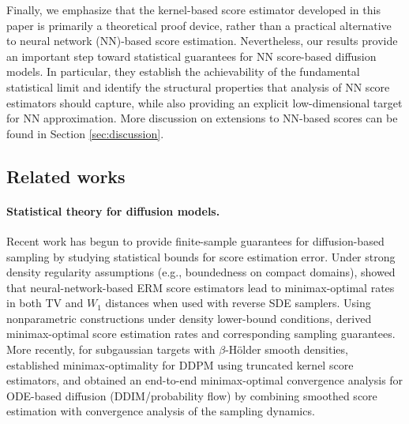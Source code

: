 \documentclass{article}
\theoremstyle{plain}
\theoremstyle{remark}
\begin{document}
Finally, we emphasize that the kernel-based score estimator developed in this paper is primarily a theoretical proof device, rather than a practical alternative to neural network (NN)-based score estimation. Nevertheless, our results provide an important step toward statistical guarantees for NN score-based diffusion models. 
In particular, they establish the achievability of the fundamental statistical limit and identify the structural properties that analysis of NN score estimators should capture, while also providing an explicit low-dimensional target for NN approximation. More discussion on extensions to NN-based scores can be found in Section \ref{sec:discussion}.





\subsection{Related works}
\label{sec:related works}

\paragraph*{Statistical theory for diffusion models.}
Recent work has begun to provide finite-sample guarantees for diffusion-based sampling by studying statistical bounds for score estimation error.
Under strong density regularity assumptions (e.g., boundedness on compact domains), \citet{oko2023diffusionmodelsminimaxoptimal} showed that neural-network-based ERM score estimators lead to minimax-optimal rates in both TV and $W_1$ distances when used with reverse SDE samplers.
Using nonparametric constructions under density lower-bound conditions, \citet{dou2024optimalscorematchingoptimal} derived minimax-optimal score estimation rates and corresponding sampling guarantees.
More recently, for subgaussian targets with $\beta$-H\"older smooth densities, \citet{zhang2024minimaxoptimalityscorebaseddiffusion} established minimax-optimality for DDPM using truncated kernel score estimators, and \citet{cai2025minimaxoptimalityprobabilityflow} obtained an end-to-end minimax-optimal convergence analysis for ODE-based diffusion (DDIM/probability flow) by combining smoothed score estimation with convergence analysis of the sampling dynamics. 
\end{document}
